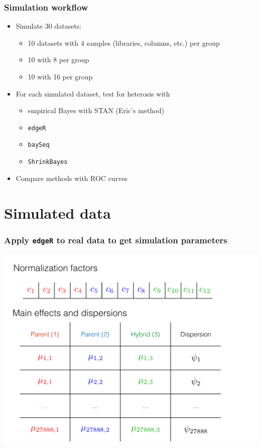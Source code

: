 \documentclass{beamer}
\numberwithin{equation}{section}
\begin{document}
\begin{frame}
\frametitle{Simulation workflow}

\begin{itemize}
\item Simulate 30 datasets:
\begin{itemize}
\item 10 datasets with 4 samples (libraries, columns, etc.) per group
\item 10 with 8 per group
\item 10 with 16 per group
\end{itemize}
\pause \item For each simulated dataset, test for heterosis with
\begin{itemize}
\item empirical Bayes with STAN (Eric's method)
\item {\tt edgeR} 
\item {\tt baySeq}
\item {\tt ShrinkBayes}
\end{itemize}
\pause \item Compare methods with ROC curves
\end{itemize}
\end{frame}

\section{Simulated data}


\begin{frame}
\frametitle{Apply {\tt edgeR} to real data to get simulation parameters}
\begin{center}
\includegraphics[scale=.25]{parms}
\end{center}
\end{frame}
\end{document}
